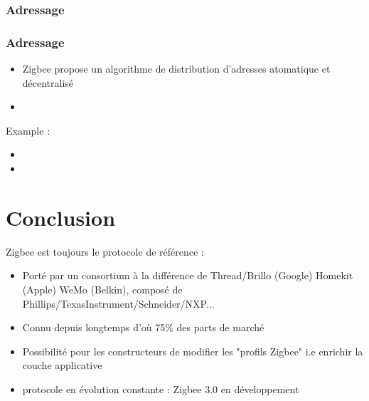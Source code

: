 \documentclass{beamer}
\begin{document}
  \begin{frame}
   \frametitle{Adressage}
  \end{frame}



  \begin{frame}
    \frametitle{Adressage}
    \begin{itemize}
      \item Zigbee propose un algorithme de distribution d'adresses atomatique et décentralisé
      \item 
    \end{itemize}
    Example : 
    \begin{itemize}
      \item 
      \item 
    \end{itemize}
  \end{frame}

  \section{Conclusion}

  \begin{frame}
    \begin{block}{Zigbee est toujours le protocole de référence :}
      \begin{itemize}
	\item Porté par un consortium à la différence de Thread/Brillo (Google) Homekit (Apple) WeMo (Belkin), composé de Phillips/TexasInstrument/Schneider/NXP...
	\item Connu depuis longtemps d'où 75\% des parts de marché
	\item Possibilité pour les constructeurs de modifier les "profils Zigbee" i.e enrichir la couche applicative
	\item protocole en évolution constante : Zigbee 3.0 en développement
      \end{itemize}  
    \end{block}
  \end{frame}
  
\end{document}
